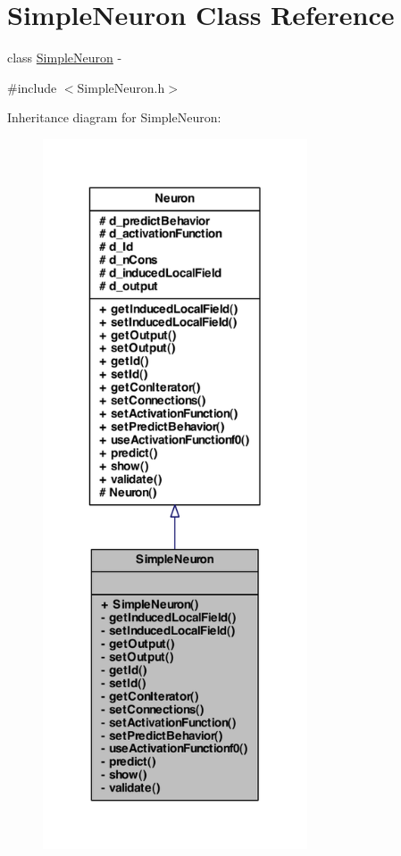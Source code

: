 \hypertarget{class_simple_neuron}{
\section{SimpleNeuron Class Reference}
\label{class_simple_neuron}
}


class \hyperlink{class_simple_neuron}{SimpleNeuron} -\/  




{\ttfamily \#include $<$SimpleNeuron.h$>$}



Inheritance diagram for SimpleNeuron:
\nopagebreak
\begin{figure}[H]
\begin{center}
\leavevmode
\includegraphics[width=222pt]{class_simple_neuron__inherit__graph}
\end{center}
\end{figure}


